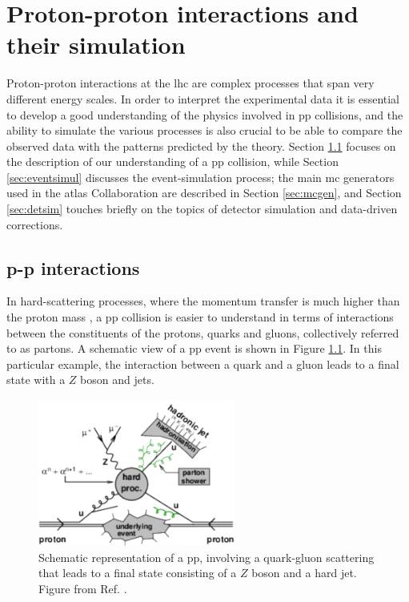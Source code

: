 \chapter{Proton-proton interactions and their simulation}
\label{chap:event:MC}

Proton-proton interactions at the \gls{lhc} are complex processes that span very different energy scales. 
In order to interpret the experimental data it is essential to develop a good understanding of the physics involved in \gls{pp} collisions, and the ability to simulate the various processes is also crucial to be able to compare the observed data with the patterns predicted by the theory.
Section \ref{sec:ppint} focuses on the description of our understanding of a \gls{pp} collision, while Section \ref{sec:eventsimul} 
discusses the event-simulation process; 
the main \gls{mc} generators used in the \gls{atlas} Collaboration are described in Section \ref{sec:mcgen}, and Section \ref{sec:detsim} touches briefly on the topics of detector simulation and data-driven corrections.



\section{p-p interactions}
\label{sec:ppint}

In hard-scattering processes, where the momentum transfer is much higher than the proton mass \cite{Butterworth:2012fj}, 
a \gls{pp} collision is easier to understand in terms of interactions between the constituents of the protons, quarks and gluons, 
collectively referred to as partons. A schematic view of a \gls{pp} event is shown in Figure \ref{fig:sim:pp2}. In this particular example, the interaction between a quark and a gluon leads to a final state with a $Z$ boson and jets. 

\begin{figure}[h]
\begin{center}
    \includegraphics[width=0.58\textwidth]{figures/simul/ppcoll2}
\end{center}
 \caption{Schematic representation of a \gls{pp}, involving a quark-gluon scattering that leads to a final state consisting of a $Z$ boson and a hard jet. Figure from Ref. \cite{Butterworth:2012fj}.}
  \label{fig:sim:pp2}
\end{figure}

